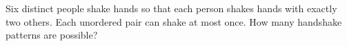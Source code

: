 Six distinct people shake hands so that each person shakes hands with exactly two others. Each unordered pair can shake at most once. How many handshake patterns are possible?

